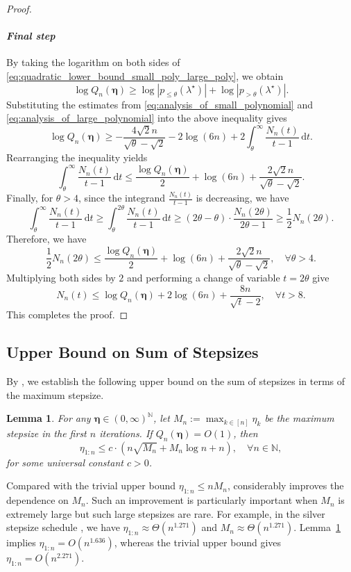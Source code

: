 \documentclass[11pt]{article}
\newcommand{\N}{\mathbb{N}}
\newcommand{\du}{\mathrm{d}}
\newcommand{\abs}[1]{\left\lvert#1\right\rvert}
\newcommand{\schedule}{\bm{\eta}}
\newtheorem{lemma}{Lemma}[section]
\begin{document}
\begin{proof}
\paragraph{\textbf{\textit{Final step}}}
By taking the logarithm on both sides of \eqref{eq:quadratic_lower_bound_small_poly_large_poly}, we obtain
\[
	\log Q_n(\schedule)
    \geq \log \abs{ p_{\leq\theta}(\lambda^\star) } + \log \abs{ p_{>\theta}(\lambda^\star) }.
\]
Substituting the estimates from \eqref{eq:analysis_of_small_polynomial} and \eqref{eq:analysis_of_large_polynomial} into the above inequality gives
\[
	\log Q_n(\schedule)
	\geq - \frac{4\sqrt{2}n}{\sqrt{\theta}-\sqrt{2}} - 2\log (6n)
	+ 2\int_{\theta}^\infty \frac{N_n(t)}{t-1}\,\du t.
\]
Rearranging the inequality yields
\[
	\int_{\theta}^\infty \frac{N_n(t)}{t-1}\,\du t
	\leq \frac{ \log Q_n(\schedule) }{2} + \log (6n) + \frac{2\sqrt{2}n}{\sqrt{\theta}-\sqrt{2}}.
\]
Finally, for $\theta > 4$, since the integrand $\frac{N_n(t)}{t-1}$ is decreasing, we have
\[
	\int_{\theta}^\infty \frac{N_n(t)}{t-1}\,\du t
	\geq \int_{\theta}^{2\theta} \frac{N_n(t)}{t-1}\,\du t
	\geq (2\theta-\theta)\cdot\frac{N_n(2\theta)}{2\theta-1}
	\geq \frac{1}{2} N_n(2\theta).
\]
Therefore, we have
\[
	\frac{1}{2}N_n(2\theta)
	\leq \frac{ \log Q_n(\schedule) }{2} + \log (6n) + \frac{2\sqrt{2}n}{\sqrt{\theta}-\sqrt{2}}, \quad\forall \theta>4.
\]
Multiplying both sides by $2$ and performing a change of variable $t=2\theta$ give
\[
    N_n(t) \leq \log Q_n(\schedule) + 2\log(6n) + \frac{8n}{\sqrt{t}-2}, \quad\forall t>8.
\]
This completes the proof.
\end{proof}


\subsection{Upper Bound on Sum of Stepsizes}

By , we establish the following upper bound on the sum of stepsizes in terms of the maximum stepsize.

\begin{lemma}\label{lem:bound_on_large_step_to_bound_on_sum}
For any $\schedule\in(0,\infty)^{\N}$, let $M_n:=\max_{k\in[n]}\eta_k$ be the maximum stepsize in the first $n$ iterations.
If $Q_n(\schedule)=O(1)$, then
\[
	\eta_{1:n} \leq c\cdot \left( n\sqrt{M_n} + M_n \log n + n \right), \quad\forall n\in\N,
\]
for some universal constant $c>0$.
\end{lemma}


Compared with the trivial upper bound $\eta_{1:n}\leq nM_n$,  considerably improves the dependence on $M_n$.
Such an improvement is particularly important when $M_n$ is extremely large but such large stepsizes are rare.
For example, in the silver stepsize schedule \cite{altschuler:2024b}, we have $\eta_{1:n} \approx \Theta(n^{1.271})$ and $M_n \approx \Theta(n^{1.271})$.
Lemma~\ref{lem:bound_on_large_step_to_bound_on_sum} implies $\eta_{1:n}= O(n^{1.636})$, whereas the trivial upper bound gives $\eta_{1:n}= O(n^{2.271})$.
\end{document}
